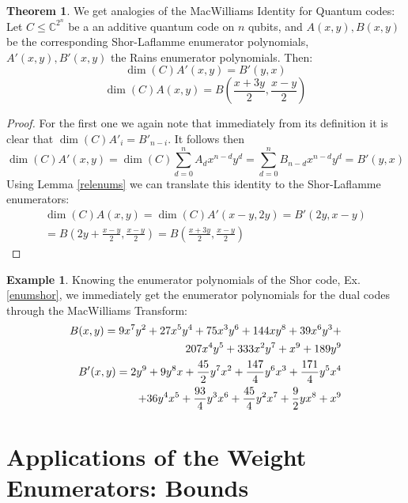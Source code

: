 \documentclass[12pt,a4paper,BCOR15mm,twoside,DIV12]{article}
\def\C{\mathbb{C}}
\theoremstyle{definition}
\newtheorem{theorem}[Satz]{Theorem}
\newtheorem{ex}[Satz]{Example}
\begin{document}
\begin{theorem}\label{theoremmacwilliams}
We get analogies of the MacWilliams Identity for Quantum codes: 
Let $C \leq \C^{2^n}$ be a an additive quantum code on $n$ qubits, and $A(x,y), B(x,y)$ be the corresponding Shor-Laflamme enumerator polynomials, $A'(x,y), B'(x,y)$ the Rains enumerator polynomials. Then:
\begin{equation} \dim (C) A'(x,y) =  B'(y,x) \end{equation}
\begin{equation} \dim (C) A(x,y) =  B(\frac{x+3y}{2},\frac{x-y}{2}) \end{equation}
\begin{proof}
For the first one we again note that immediately from its definition it is clear that $\dim(C) A'_i =  B'_{n-i}$. It follows then
\begin{equation*} \dim (C) A'(x,y) = \dim (C) \sum_{d=0}^n A_d x^{n-d}y^d = \sum_{d=0}^n  B_{n-d} x^{n-d}y^d =  B'(y,x) \end{equation*}
Using Lemma \ref{relenums} we can translate this identity to the Shor-Laflamme enumerators: 
\begin{align*} \dim (C) A(x,y) = \dim (C) A'(x-y,2y) =  B'(2y,x-y) 
\\= B(2y + \frac{x-y}{2},\frac{x-y}{2}) =  B(\frac{x+3y}{2},\frac{x-y}{2}) \end{align*}
\end{proof}
\end{theorem}

\begin{ex}
Knowing the enumerator polynomials of the Shor code, Ex. \ref{enumshor}, we immediately get the enumerator polynomials for the dual codes through the MacWilliams Transform: 
\begin{align}
B(x,y) = 9x^7y^2+27x^5y^4+75x^3y^6+144xy^8  +39x^6y^3+ \notag \\ 207x^4y^5+333x^2y^7+x^9+189y^9\\
B'(x,y) = 2y^9 + 9 y^8x + \frac{45}{2} y^7x^2 + \frac{147}{4} y^6x^3 + \frac{171}{4} y^5x^4 \notag \\ + 36 y^4 x^5 + \frac{93}{4} y^3 x^6 + \frac{45}{4} y^2 x^7 + \frac 9 2 y x^8 + x^9
\end{align}
\end{ex}

\clearpage
\section{Applications of the Weight Enumerators: Bounds}
\end{document}
